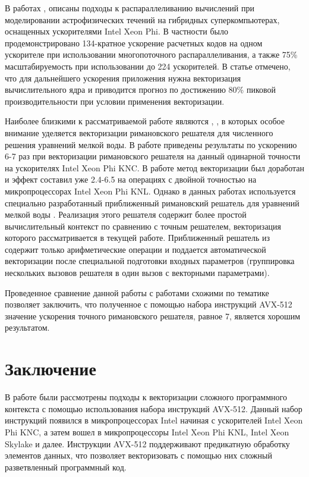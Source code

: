 \documentclass[utf8]{psta}
\begin{document}
В работах \cite{Kulikov}, \cite{Kulikov2} описаны подходы к распараллеливанию вычислений при моделировании астрофизических течений на гибридных суперкомпьютерах, оснащенных ускорителями Intel Xeon Phi.
В частности было продемонстрировано 134-кратное ускорение расчетных кодов на одном ускорителе при использовании многопоточного распараллеливания, а также 75\% масштабируемость при использовании до 224 ускорителей.
В статье отмечено, что для дальнейшего ускорения приложения нужна векторизация вычислительного ядра и приводится прогноз по достижению 80\% пиковой производительности при условии применения векторизации.

Наиболее близкими к рассматриваемой работе являются \cite{BaderSWEVect}, \cite{FerreiraSWEVect}, в которых особое внимание уделяется векторизации римановского решателя для численного решения уравнений мелкой воды.
В работе \cite{BaderSWEVect} приведены результаты по ускорению 6-7 раз при векторизации римановского решателя на данный одинарной точности на ускорителях Intel Xeon Phi KNC.
В работе \cite{FerreiraSWEVect} метод векторизации был доработан и эффект составил уже 2.4-6.5 на операциях с двойной точностью на микропроцессорах Intel Xeon Phi KNL.
Однако в данных работах используется специально разработанный приближенный римановский решатель для уравнений мелкой воды \cite{George}.
Реализация этого решателя содержит более простой вычислительный контекст по сравнению с точным решателем, векторизация которого рассматривается в текущей работе.
Приближенный решатель из \cite{George} содержит только арифметические операции и поддается автоматической векторизации после специальной подготовки входных параметров (группировка нескольких вызовов решателя в один вызов с векторными параметрами).

Проведенное сравнение данной работы с работами схожими по тематике позволяет заключить, что полученное с помощью набора инструкций AVX-512 значение ускорения точного римановского решателя, равное 7, является хорошим результатом.

\section*{Заключение}

В работе были рассмотрены подходы к векторизации сложного программного контекста с помощью использования набора инструкций AVX-512.
Данный набор инструкций появился в микропроцессорах Intel начиная с ускорителей Intel Xeon Phi KNC, а затем вошел в микропроцессоры Intel Xeon Phi KNL, Intel Xeon Skylake и далее.
Инструкции AVX-512 поддерживают предикатную обработку элементов данных, что позволяет векторизовать с помощью них сложный разветвленный программный код.
\end{document}
